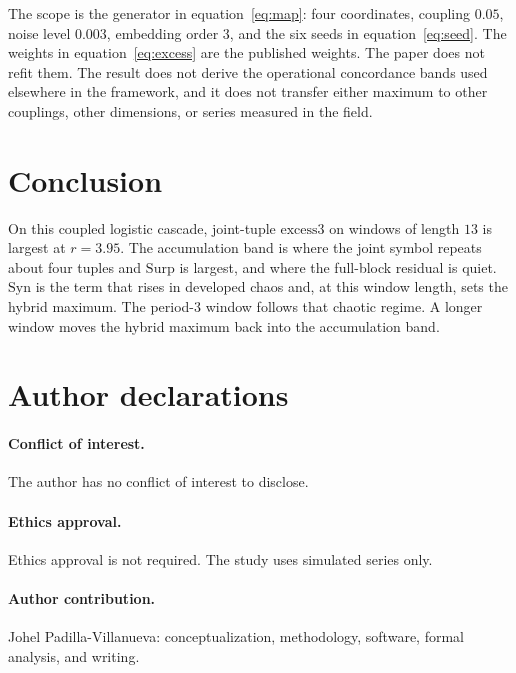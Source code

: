 \documentclass[11pt,a4paper]{article}
\newcommand{\excess}{\mathrm{excess3}}
\begin{document}
The scope is the generator in equation~\eqref{eq:map}: four coordinates,
coupling $0.05$, noise level $0.003$, embedding order $3$, and the six
seeds in equation~\eqref{eq:seed}. The weights in equation~\eqref{eq:excess}
are the published weights. The paper does not refit them. The result does
not derive the operational concordance bands used elsewhere in the
framework, and it does not transfer either maximum to other couplings,
other dimensions, or series measured in the field.

\section{Conclusion}
\label{sec:conclusion}

On this coupled logistic cascade, joint-tuple $\excess$ on windows of
length $13$ is largest at $r=3.95$. The accumulation band is where the
joint symbol repeats about four tuples and $\mathrm{Surp}$ is largest,
and where the full-block residual is quiet. $\mathrm{Syn}$ is the term
that rises in developed chaos and, at this window length, sets the hybrid
maximum. The period-3 window follows that chaotic regime. A longer window
moves the hybrid maximum back into the accumulation band.

\section*{Author declarations}

\paragraph{Conflict of interest.}
The author has no conflict of interest to disclose.

\paragraph{Ethics approval.}
Ethics approval is not required. The study uses simulated series only.

\paragraph{Author contribution.}
Johel Padilla-Villanueva: conceptualization, methodology, software, formal
analysis, and writing.
\end{document}
